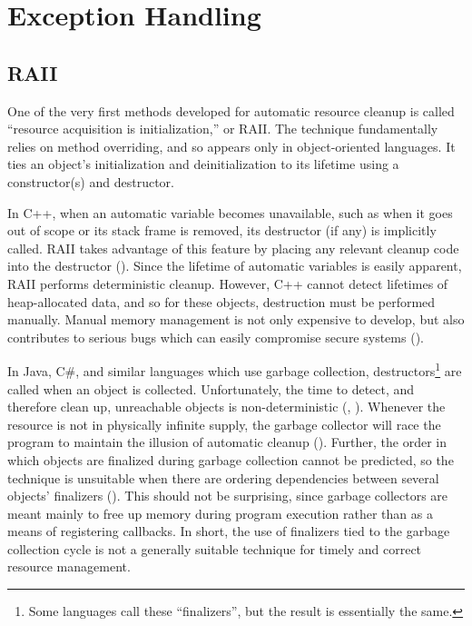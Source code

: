 \documentclass[11pt]{article}
\newcommand{\maybePage}{\null}
\begin{document}
\maybePage
\section{Exception Handling}

\subsection{RAII}
\label{RAII}

One of the very first methods developed for automatic resource cleanup is called ``resource acquisition is initialization,'' or RAII.
The technique fundamentally relies on method overriding, and so appears only in object-oriented languages.
It ties an object's initialization and deinitialization to its lifetime using a constructor(s) and destructor.

In C++, when an automatic variable becomes unavailable, such as when it goes out of scope or its stack frame is removed, its destructor (if any) is implicitly called.
RAII takes advantage of this feature by placing any relevant cleanup code into the destructor (\cite{cplusplusLanguage}).
Since the lifetime of automatic variables is easily apparent, RAII performs deterministic cleanup.
However, C++ cannot detect lifetimes of heap-allocated data, and so for these objects, destruction must be performed manually.
Manual memory management is not only expensive to develop, but also contributes to serious bugs which can easily compromise secure systems (\cite{WeimerNecula08}).


In Java, C\#, and similar languages which use garbage collection, destructors\footnote{Some languages call these ``finalizers'', but the result is essentially the same.} are called when an object is collected.
Unfortunately, the time to detect, and therefore clean up, unreachable objects is non-deterministic (\cite{JavaStandard}, \cite{cSharpStandard}).
Whenever the resource is not in physically infinite supply, the garbage collector will race the program to maintain the illusion of automatic cleanup (\cite{WeimerNecula08}).
Further, the order in which objects are finalized during garbage collection cannot be predicted, so the technique is unsuitable when there are ordering dependencies between several objects' finalizers (\cite{WeimerNecula08}).
This should not be surprising, since garbage collectors are meant mainly to free up memory during program execution rather than as a means of registering callbacks.
In short, the use of finalizers tied to the garbage collection cycle is not a generally suitable technique for timely and correct resource management.
\end{document}
